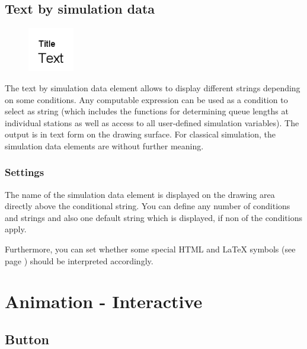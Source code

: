 \section{Text by simulation data}
\label{ref:ModelElementAnimationTextSelect}

\begin{figure}
\vspace{-22pt}
\includegraphics[width=2cm]{imageModelElementAnimationTextSelect.png}
\vspace{-22pt}
\end{figure}

The text by simulation data element allows to display different strings depending on some conditions.
Any computable expression can be used as a condition to select as string (which includes the functions for
determining queue lengths at individual stations as well as access to all user-defined simulation
variables). The output is in text form on the drawing surface. For classical simulation, the simulation
data elements are without further meaning.

\subsection*{Settings}

The name of the simulation data element is displayed on the drawing area directly above the conditional string.
You can define any number of conditions and strings and also one default string which is displayed,
if non of the conditions apply.

Furthermore, you can set whether some special HTML and LaTeX symbols (see page \pageref{ref:TextEntities}) should
be interpreted accordingly.





\chapter{Animation - Interactive}

\section{Button}
\label{ref:ModelElementInteractiveButton}

